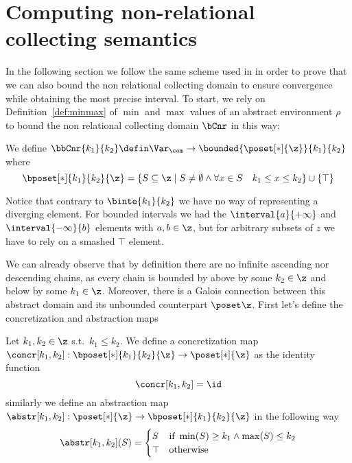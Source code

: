 \section{Computing non-relational collecting semantics}\label{sec:computingnonrel}

In the following section we follow the same scheme used in
 in order to prove that we can also bound
the non relational collecting domain to ensure convergence while
obtaining the most precise interval.  To start, we rely on
Definition~\ref{def:minmax} of \(\min\) and \(\max\) values of an
abstract environment \(\rho\) to bound the non relational collecting
domain \(\bCnr\) in this way:

\begin{definition}
  We define
  \(\bbCnr{k_1}{k_2} \defin \Var_{\com} \to \bounded{\poset[*]{\z}}{k_1}{k_2}\) where
  \begin{equation*}
    \bposet[*]{k_1}{k_2}{\z} = \{S \subseteq \z \mid S \neq \emptyset \land \forall x \in S \quad k_1 \leq x \leq k_2\} \cup \{\top\}
  \end{equation*}
\end{definition}
Notice that contrary to \(\binte{k_1}{k_2}\) we have no way of
representing a diverging element. For bounded intervals we had the
\(\interval{a}{+\infty}\) and \(\interval{-\infty}{b}\) elements with
\(a,b\in\z\), but for arbitrary subsets of \(z\) we have to rely on a
smashed \(\top\) element.

\medskip

\noindent
We can already observe that by definition there are no infinite
ascending nor descending chains, as every chain is bounded by above
by some \(k_2 \in \z\) and below by some \(k_1\in\z\). Moreover, there
is a Galois connection between this abstract domain and its unbounded
counterpart \(\poset\z\). First let's define the concretization and
abstraction maps

\begin{definition}\label{def:abstrnrb}
  Let \(k_1,k_2\in\z\) s.t.\ \(k_1 \leq k_2\). We define a
  concretization map
  \(\concr[k_1,k_2] : \bposet[*]{k_1}{k_2}{\z} \to \poset[*]{\z}\) as
  the identity function
  \begin{equation*}
    \concr[k_1,k_2] = \id
  \end{equation*}
  similarly we define an abstraction map
  \(\abstr[k_1,k_2] : \poset[*]{\z} \to \bposet[*]{k_1}{k_2}{\z}\) in
  the following way
  \begin{equation*}
    \abstr[k_1,k_2](S) = \begin{cases}
      S & \text{if } \min(S) \geq k_1 \land \max(S) \leq k_2 \\
      \top & \text{otherwise}
    \end{cases}
  \end{equation*}
\end{definition}

